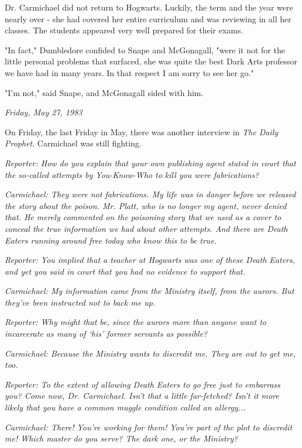 \documentclass[a4paper,11pt]{article}
\begin{document}
Dr. Carmichael did not return to Hogwarts. Luckily, the term and the year were nearly over - she had covered her entire curriculum and was reviewing in all her classes. The students appeared very well prepared for their exams.

"In fact," Dumbledore confided to Snape and McGonagall, "were it not for the little personal problems that surfaced, she was quite the best Dark Arts professor we have had in many years. In that respect I am sorry to see her go."

"I'm not," said Snape, and McGonagall sided with him.

\emph{Friday, May 27, 1983}

On Friday, the last Friday in May, there was another interview in \emph{The Daily Prophet}. Carmichael was still fighting.

\emph{Reporter: How do you explain that your own publishing agent stated in court that the so-called attempts by You-Know-Who to kill you were fabrications?}

\emph{Carmichael: They were not fabrications. My life was in danger before we released the story about the poison. Mr. Platt, who is no longer my agent, never denied that. He merely commented on the poisoning story that we used as a cover to conceal the true information we had about other attempts. And there are Death Eaters running around free today who know this to be true.}

\emph{Reporter: You implied that a teacher at Hogwarts was one of these Death Eaters, and yet you said in court that you had no evidence to support that.}

\emph{Carmichael: My information came from the Ministry itself, from the aurors. But they've been instructed not to back me up.}

\emph{Reporter: Why might that be, since the aurors more than anyone want to incarcerate as many of `his' former servants as possible?}

\emph{Carmichael: Because the Ministry wants to discredit me. They are out to get me, too.}

\emph{Reporter: To the extent of allowing Death Eaters to go free just to embarrass you? Come now, Dr. Carmichael. Isn't that a little far-fetched? Isn't it more likely that you have a common muggle condition called an allergy...}

\emph{Carmichael: There! You're working for them! You're part of the plot to discredit me! Which master do you serve? The dark one, or the Ministry?}
\end{document}
